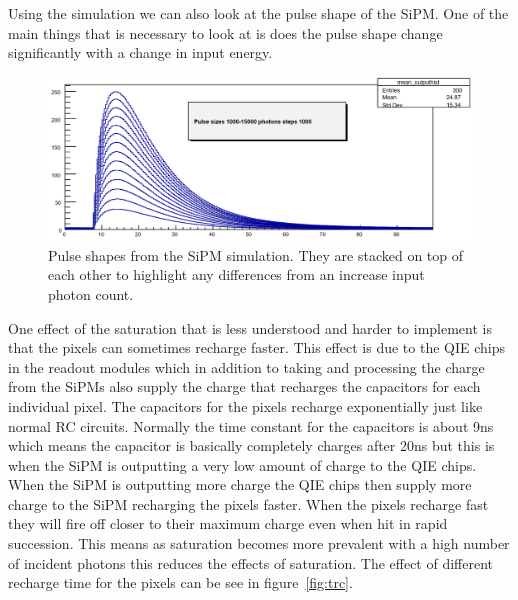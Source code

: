 

Using the simulation we can also look at the pulse shape of the SiPM. One of the main things that is necessary to look at is does the pulse shape change significantly with a change in input energy.

\begin{figure}
\centering
\includegraphics[width=\linewidth]{Figures/SimPul.png}
\caption{Pulse shapes from the SiPM simulation. They are stacked on top of each other to highlight any differences from an increase input photon count.}
\label{fig:SimPul}
\end{figure}


One effect of the saturation that is less understood and harder to implement is that the pixels can sometimes recharge faster. This effect is due to the QIE chips in the readout modules which in addition to taking and processing the charge from the SiPMs also supply the charge that recharges the capacitors for each individual pixel. The capacitors for the pixels recharge exponentially just like normal RC circuits. Normally the time constant for the capacitors is about 9ns which means the capacitor is basically completely charges after 20ns but this is when the SiPM is outputting a very low amount of charge to the QIE chips. When the SiPM is outputting more charge the QIE chips then supply more charge to the SiPM recharging the pixels faster. When the pixels recharge fast they will fire off closer to their maximum charge even when hit in rapid succession. This means as saturation becomes more prevalent with a high number of incident photons this reduces the effects of saturation. The effect of different recharge time for the pixels can be see in figure~\ref{fig:trc}.

